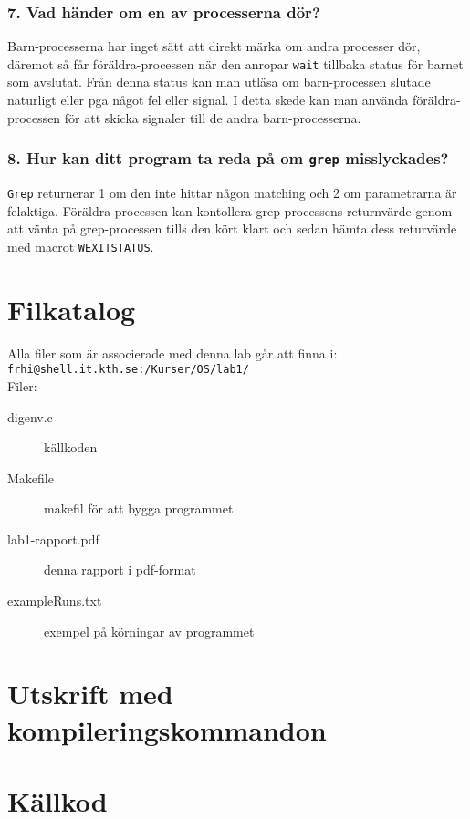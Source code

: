 \documentclass[a4paper]{article}
\begin{document}
\subsubsection*{7. Vad händer om en av processerna dör?}
Barn-processerna har inget sätt att direkt märka om andra processer dör, däremot så får föräldra-processen när den anropar \texttt{wait} tillbaka status för barnet som avslutat. Från denna status kan man utläsa om barn-processen slutade naturligt eller pga något fel eller signal. I detta skede kan man använda föräldra-processen för att skicka signaler till de andra barn-processerna.

\subsubsection*{8. Hur kan ditt program ta reda på om \texttt{grep} misslyckades?}
\texttt{Grep} returnerar 1 om den inte hittar någon matching och 2 om parametrarna är felaktiga. Föräldra-processen kan kontollera grep-processens returnvärde genom att vänta på grep-processen tills den kört klart och sedan hämta dess returvärde med macrot \texttt{WEXITSTATUS}.

\section*{Filkatalog}
Alla filer som är associerade med denna lab går att finna i:
\texttt{frhi@shell.it.kth.se:/Kurser/OS/lab1/}
\\
Filer:
\begin{description}
\item[digenv.c] källkoden
\item[Makefile] makefil för att bygga programmet
\item[lab1-rapport.pdf] denna rapport i pdf-format
\item[exampleRuns.txt] exempel på körningar av programmet
\end{description}

\section*{Utskrift med kompileringskommandon}


\section*{Källkod}

\end{document}
